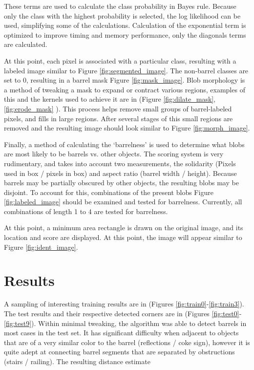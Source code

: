 \documentclass[a4paper]{article}
\begin{document}
	These terms are used to calculate the class probability in Bayes rule. Because only the class with the highest probability is selected, the log likelihood can be used, simplifying some of the calculations. Calculation of the exponential term is optimized to improve timing and memory performance, only the diagonals terms are calculated.
    
	At this point, each pixel is associated with a particular class, resulting with a labeled image similar to Figure \ref{fig:segmented_image}. The non-barrel classes are set to 0, resulting in a barrel mask Figure \ref{fig:mask_image}. Blob morphology is a method of tweaking a mask to expand or contract various regions, examples of this and the kernels used to achieve it are in (Figure \ref{fig:dilate_mask}, \ref{fig:erode_mask} ). This process helps remove small groups of barrel-labeled pixels, and fills in large regions. After several stages of this small regions are removed and the resulting image should look similar to Figure \ref{fig:morph_image}.
    
	Finally, a method of calculating the ‘barrelness’ is used to determine what blobs are most likely to be barrels vs. other objects. The scoring system is very rudimentary, and takes into account two measurements, the solidarity (Pixels used in box / pixels in box) and aspect ratio (barrel width / height). Because barrels may be partially obscured by other objects, the resulting blobs may be disjoint. To account for this, combinations of the present blobs Figure \ref{fig:labeled_image} should be examined and tested for barrelness. Currently, all combinations of length 1 to 4 are tested for barrelness.
    
	At this point, a minimum area rectangle is drawn on the original image, and its location and score are displayed. At this point, the image will appear similar to Figure \ref{fig:ident_image}.

\section{Results}

A sampling of interesting training results are in (Figures \ref{fig:train0}-\ref{fig:train3}). The test results and their respective detected corners are in (Figures \ref{fig:test0}-\ref{fig:test9}). Within minimal tweaking, the algorithm was able to detect barrels in most cases in the test set. It has significant difficulty when adjacent to objects that are of a very similar color to the barrel (reflections / coke sign), however it is quite adept at connecting barrel segments that are separated by obstructions (stairs / railing). The resulting distance estimate
\end{document}
